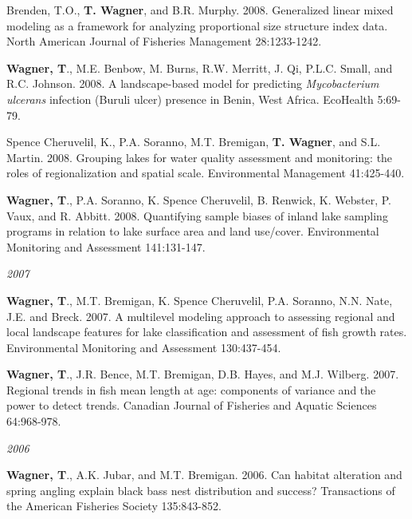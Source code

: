 \documentclass[10pt]{article}
\begin{document}
\begin{flushleft}
\begin{etaremune}[start=14]
\item Brenden, T.O., {\bf T. Wagner}, and B.R. Murphy. 2008. Generalized linear mixed modeling as a framework for analyzing proportional size structure index data. North American Journal of Fisheries Management 28:1233-1242.

\item {\bf Wagner, T}., M.E. Benbow, M. Burns, R.W. Merritt, J. Qi, P.L.C. Small, and R.C. Johnson. 2008. A landscape-based model for predicting \emph{Mycobacterium ulcerans} infection (Buruli ulcer) presence in Benin, West Africa. EcoHealth 5:69-79.

\item Spence Cheruvelil, K., P.A. Soranno, M.T. Bremigan, {\bf T. Wagner}, and S.L. Martin. 2008. Grouping lakes for water quality assessment and monitoring: the roles of regionalization and spatial scale. Environmental Management 41:425-440. 

\item {\bf Wagner, T}., P.A. Soranno, K. Spence Cheruvelil, B. Renwick, K. Webster, P. Vaux, and R. Abbitt. 2008. Quantifying sample biases of inland lake sampling programs in relation to lake surface area and land use/cover. Environmental Monitoring and Assessment 141:131-147.

\end{etaremune}
\emph{2007}
\begin{etaremune}[start=9]
\item {\bf Wagner, T}., M.T. Bremigan, K. Spence Cheruvelil, P.A. Soranno, N.N. Nate, J.E. and Breck. 2007. A multilevel modeling approach to assessing regional and local landscape features for lake classification and assessment of fish growth rates. Environmental Monitoring and Assessment 130:437-454.

\item {\bf Wagner, T}., J.R. Bence, M.T. Bremigan, D.B. Hayes, and M.J. Wilberg. 2007. Regional trends in fish mean length at age: components of variance and the power to detect trends. Canadian Journal of Fisheries and Aquatic Sciences 64:968-978.

\end{etaremune}
\emph{2006}
\begin{etaremune}[start=7]
\item {\bf Wagner, T}., A.K. Jubar, and M.T. Bremigan. 2006. Can habitat alteration and spring angling explain black bass nest distribution and success? Transactions of the American Fisheries Society 135:843-852.


\end{etaremune}
\end{flushleft}
\end{document}
